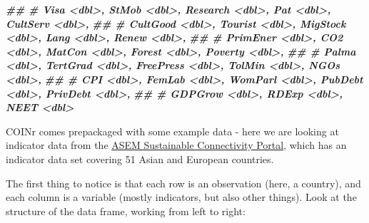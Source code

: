 \documentclass[
]{book}
\newenvironment{Shaded}{\begin{snugshade}}{\end{snugshade}}
\newcommand{\DocumentationTok}[1]{\textcolor[rgb]{0.56,0.35,0.01}{\textbf{\textit{#1}}}}
\begin{document}
\begin{Shaded}
\begin{Highlighting}[]
\DocumentationTok{\#\# \#   Visa \textless{}dbl\textgreater{}, StMob \textless{}dbl\textgreater{}, Research \textless{}dbl\textgreater{}, Pat \textless{}dbl\textgreater{}, CultServ \textless{}dbl\textgreater{},}
\DocumentationTok{\#\# \#   CultGood \textless{}dbl\textgreater{}, Tourist \textless{}dbl\textgreater{}, MigStock \textless{}dbl\textgreater{}, Lang \textless{}dbl\textgreater{}, Renew \textless{}dbl\textgreater{},}
\DocumentationTok{\#\# \#   PrimEner \textless{}dbl\textgreater{}, CO2 \textless{}dbl\textgreater{}, MatCon \textless{}dbl\textgreater{}, Forest \textless{}dbl\textgreater{}, Poverty \textless{}dbl\textgreater{},}
\DocumentationTok{\#\# \#   Palma \textless{}dbl\textgreater{}, TertGrad \textless{}dbl\textgreater{}, FreePress \textless{}dbl\textgreater{}, TolMin \textless{}dbl\textgreater{}, NGOs \textless{}dbl\textgreater{},}
\DocumentationTok{\#\# \#   CPI \textless{}dbl\textgreater{}, FemLab \textless{}dbl\textgreater{}, WomParl \textless{}dbl\textgreater{}, PubDebt \textless{}dbl\textgreater{}, PrivDebt \textless{}dbl\textgreater{},}
\DocumentationTok{\#\# \#   GDPGrow \textless{}dbl\textgreater{}, RDExp \textless{}dbl\textgreater{}, NEET \textless{}dbl\textgreater{}}
\end{Highlighting}
\end{Shaded}

COINr comes prepackaged with some example data - here we are looking at indicator data from the \href{https://composite-indicators.jrc.ec.europa.eu/asem-sustainable-connectivity/}{ASEM Sustainable Connectivity Portal}, which has an indicator data set covering 51 Asian and European countries.

The first thing to notice is that each row is an observation (here, a country), and each column is a variable (mostly indicators, but also other things). Look at the structure of the data frame, working from left to right:
\end{document}
